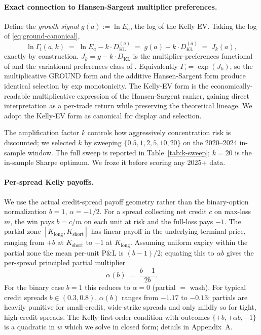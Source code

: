 \documentclass[11pt]{article}
\newcommand{\GROUND}{\Gamma_{\mathrm{i}}}
\begin{document}
\paragraph{Exact connection to Hansen-Sargent multiplier preferences.}
Define the \emph{growth signal} $g(a) := \ln E_a$, the log of the
Kelly EV. Taking the log of \eqref{eq:ground-canonical},
\begin{equation}
    \ln \GROUND(a, k) \;=\; \ln E_a - k \cdot D_{\mathrm{KL}}^{(a)}
    \;=\; g(a) - k \cdot D_{\mathrm{KL}}^{(a)}
    \;=\; J_k(a),
    \label{eq:ground-hs-link}
\end{equation}
exactly by construction. $J_k = g - k \cdot D_{\mathrm{KL}}$ is the
multiplier-preferences functional of \citet{hansen2008robustness} and
the variational preferences class of
\citet{maccheroni2006ambiguity}. Equivalently $\GROUND = \exp(J_k)$, so
the multiplicative GROUND form and the additive Hansen-Sargent form
produce identical selection by exp monotonicity. The Kelly-EV form is
the economically-readable multiplicative expression of the
Hansen-Sargent ranker, gaining direct interpretation as a per-trade
return while preserving the theoretical lineage. We adopt the Kelly-EV
form as canonical for display and selection.

The amplification factor $k$ controls how aggressively concentration
risk is discounted; we selected $k$ by sweeping $\{0.5, 1, 2, 5, 10,
20\}$ on the 2020--2024 in-sample window. The full sweep is reported
in Table~\ref{tab:k-sweep}; $k = 20$ is the in-sample Sharpe optimum.
We froze it before scoring any 2025+ data.

\paragraph{Per-spread Kelly payoffs.}
We use the actual credit-spread payoff geometry rather than the
binary-option normalization $b=1$, $\alpha = -1/2$. For a spread
collecting net credit $c$ on max-loss $m$, the win pays $b = c/m$ on
each unit at risk and the full-loss pays $-1$. The partial zone
$[K_{\text{long}}, K_{\text{short}}]$ has linear payoff in the
underlying terminal price, ranging from $+b$ at $K_{\text{short}}$ to
$-1$ at $K_{\text{long}}$. Assuming uniform expiry within the partial
zone the mean per-unit P\&L is $(b-1)/2$; equating this to $\alpha b$
gives the per-spread principled partial multiplier
\begin{equation}
    \alpha(b) \;=\; \frac{b - 1}{2b}.
    \label{eq:alpha-b}
\end{equation}
For the binary case $b = 1$ this reduces to $\alpha = 0$ (partial $=$
wash). For typical credit spreads $b \in (0.3, 0.8)$, $\alpha(b)$
ranges from $-1.17$ to $-0.13$: partials are heavily punitive for
small-credit, wide-strike spreads and only mildly so for tight,
high-credit spreads. The Kelly first-order condition with outcomes
$\{+b, +\alpha b, -1\}$ is a quadratic in $w$ which we solve in
closed form; details in Appendix~A.
\end{document}
